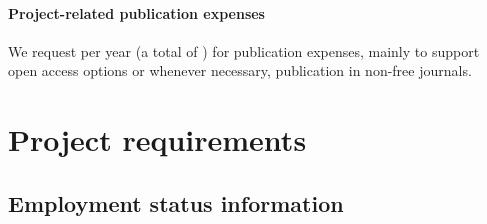 \documentclass[10pt,fleqn,twoside]{article}
\begin{document}

\paragraph{Project-related publication expenses}


We request  per year (a total of ) for publication
expenses, mainly to support open access options or whenever necessary,
publication in non-free journals.














\section{Project requirements}
\renewcommand{\leftmark}{\sc Project requirements}

\subsection{Employment status information}
\end{document}
